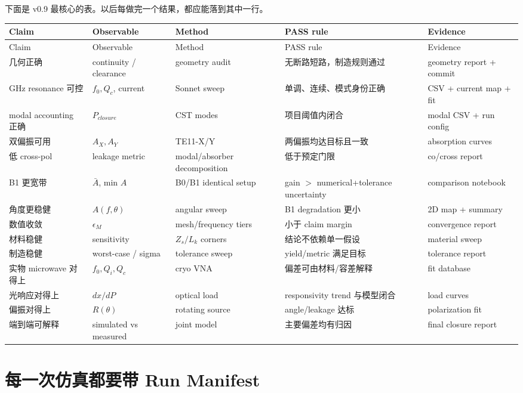 \documentclass[11pt,a4paper,openany]{ctexrep}
\begin{document}
下面是 v0.9 最核心的表。以后每做完一个结果，都应能落到其中一行。

\small
\begin{longtable}{p{2.3cm}p{3.0cm}p{2.6cm}p{3.0cm}p{3.0cm}}
\toprule
Claim & Observable & Method & PASS rule & Evidence \\
\midrule
\endfirsthead
\toprule
Claim & Observable & Method & PASS rule & Evidence \\
\midrule
\endhead
几何正确 & continuity / clearance & geometry audit & 无断路短路，制造规则通过 & geometry report + commit \\
GHz resonance 可控 & $f_0,Q_c$, current & Sonnet sweep & 单调、连续、模式身份正确 & CSV + current map + fit \\
modal accounting 正确 & $P_{closure}$ & CST modes & 项目阈值内闭合 & modal CSV + run config \\
双偏振可用 & $A_X,A_Y$ & TE11-X/Y & 两偏振均达目标且一致 & absorption curves \\
低 cross-pol & leakage metric & modal/absorber decomposition & 低于预定门限 & co/cross report \\
B1 更宽带 & $\bar A$, min $A$ & B0/B1 identical setup & gain $>$ numerical+tolerance uncertainty & comparison notebook \\
角度更稳健 & $A(f,\theta)$ & angular sweep & B1 degradation 更小 & 2D map + summary \\
数值收敛 & $\epsilon_M$ & mesh/frequency tiers & 小于 claim margin & convergence report \\
材料稳健 & sensitivity & $Z_s/L_k$ corners & 结论不依赖单一假设 & material sweep \\
制造稳健 & worst-case / sigma & tolerance sweep & yield/metric 满足目标 & tolerance report \\
实物 microwave 对得上 & $f_0,Q_i,Q_c$ & cryo VNA & 偏差可由材料/容差解释 & fit database \\
光响应对得上 & $dx/dP$ & optical load & responsivity trend 与模型闭合 & load curves \\
偏振对得上 & $R(\theta)$ & rotating source & angle/leakage 达标 & polarization fit \\
端到端可解释 & simulated vs measured & joint model & 主要偏差均有归因 & final closure report \\
\bottomrule
\end{longtable}
\normalsize

\section{每一次仿真都要带 Run Manifest}
\end{document}
